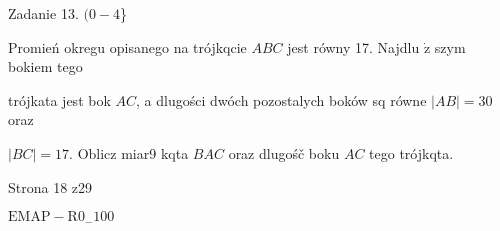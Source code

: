 \documentclass[a4paper,12pt]{article}
\begin{document}
Zadanie 13. $(0-4$\}

Promień okregu opisanego na trójkqcie $ABC$ jest równy 17. Najdlu $\dot{\mathrm{z}}$ szym bokiem tego

trójkata jest bok $AC$, a dlugości dwóch pozostalych boków sq równe $|AB|=30$ oraz

$|BC|=17$. Oblicz miar9 kqta $BAC$ oraz dlugośč boku $AC$ tego trójkqta.

Strona 18 z29

$\mathrm{E}\mathrm{M}\mathrm{A}\mathrm{P}-\mathrm{R}0_{-}100$
\end{document}
